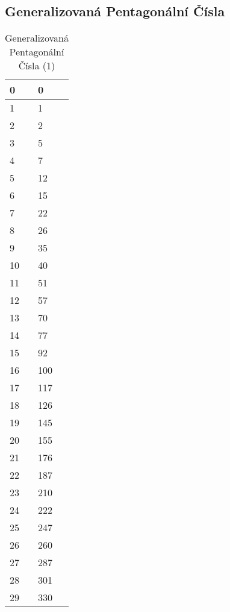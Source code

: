 \documentclass[11pt]{article}
\begin{document}
\subsection{Generalizovaná Pentagonální Čísla}
\begin{table}[H]
\centering
\caption{Generalizovaná Pentagonální Čísla (1)}
\begin{tabular}{|l|l|}
\hline
0&0\\\hline
1&1\\\hline
2&2\\\hline
3&5\\\hline
4&7\\\hline
5&12\\\hline
6&15\\\hline
7&22\\\hline
8&26\\\hline
9&35\\\hline
10&40\\\hline
11&51\\\hline
12&57\\\hline
13&70\\\hline
14&77\\\hline
15&92\\\hline
16&100\\\hline
17&117\\\hline
18&126\\\hline
19&145\\\hline
20&155\\\hline
21&176\\\hline
22&187\\\hline
23&210\\\hline
24&222\\\hline
25&247\\\hline
26&260\\\hline
27&287\\\hline
28&301\\\hline
29&330\\\hline
\end{tabular}
\end{table}
\end{document}
